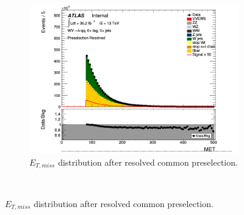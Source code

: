 \begin{figure}[ht]
\begin{subfigure}{0.3\textwidth}
            \includegraphics[width=\linewidth]{figures/1lep/CRPlots/C_0ptag0pjet_0ptv_Presel_Resolved_MET_Lin.png}
            \caption{$E_{T,miss}$ distribution after resolved common preselection.}
        \end{subfigure} \\


\end{figure}
